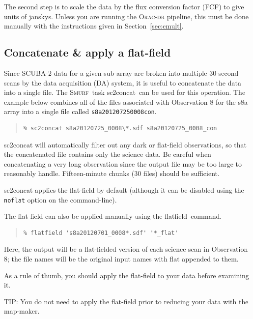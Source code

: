 \documentclass[twoside,11pt]{article}
\newcommand{\htmlref}[2]{#1}
\newenvironment{latexonly}{}{}
\newcommand{\latexhtml}[2]{#1}
\newcommand{\xref}[3]{#1}
\newcommand{\xlabel}[1]{}
\renewcommand{\_}{\texttt{\symbol{95}}}
\newenvironment{fmpage}[1]{\begin{lrbox}{\fmbox}\begin{minipage}{#1}}{\end{minipage}\end{lrbox}\fbox{\usebox{\fmbox}}}
\newenvironment{myquote}{
   \color{MidnightBlue}\begin{quote}\begin{small}}{
   \end{small}\end{quote}
}
\newcommand{\smurf}{\xref{\textsc{Smurf}}{sun258}{}}
\newcommand{\task}[1]{\textsf{#1}}
\newcommand{\param}[1]{\texttt{#1}}
\newcommand{\file}[1]{\texttt{#1}}
\newcommand{\concat}{\xref{\task{sc2concat}}{sun258}{SC2CONCAT}}
\newcommand{\flatfield}{\xref{\task{flatfield}}{sun258}{FLATFIELD}}
\newcommand{\cref}[3]{\latexhtml{#1~\ref{#2}}{\htmlref{#3}{#2}}}
\renewenvironment{myquote}{
      \begin{quote}\begin{small}}{
      \end{small}\end{quote}
   }
\begin{document}
The second step is to scale the data by the flux conversion factor
(FCF) to give units of janskys. Unless you are running the
\textsc{Orac-dr} pipeline, this must be done manually with the
instructions given in \cref{Section}{sec:cmult}{Flux conversion
factors}.


\subsection{\xlabel{concat}Concatenate \& apply a flat-field}
\label{sec:concat}

Since SCUBA-2 data for a given sub-array are broken into multiple
30-second scans by the data acquisition (DA) system, it is useful to
concatenate the data into a single file. The \smurf\ task \concat\ can
be used for this operation. The example below combines all of the
files associated with Observation 8 for the s8a array into a single
file called \file{s8a20120725\_0008\_con}.

\begin{myquote}
\begin{verbatim}
% sc2concat s8a20120725_0008\*.sdf s8a20120725_0008_con
\end{verbatim}
\end{myquote}
\task{sc2concat} will automatically filter out any dark or flat-field
observations, so that the concatenated file contains only the science
data. Be careful when concatenating a very long observation since the
output file may be too large to reasonably handle. Fifteen-minute
chunks (30 files) should be sufficient.

\task{sc2concat} applies the flat-field by default (although it can be
disabled using the \param{noflat} option on the command-line).

The flat-field can also be applied manually using the \flatfield\ command.

\begin{myquote}
\begin{verbatim}
% flatfield 's8a20120701_0008*.sdf' '*_flat'
\end{verbatim}
\end{myquote}
Here, the output will be a flat-fielded version of each science scan
in Observation 8; the file names will be the original input
names with \_flat appended to them.

As a rule of thumb, you should apply the flat-field to your data
before examining it.


\begin{latexonly}
\begin{center}
\begin{fmpage}{0.95\linewidth}
\vspace{0.1cm}
TIP: You do not need to apply the flat-field prior to reducing your
data with the map-maker.
\end{fmpage}
\end{center}
\end{latexonly}
\end{document}

